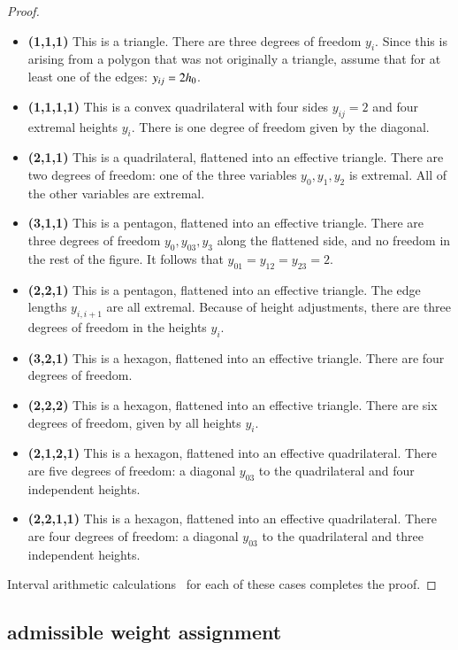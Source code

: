 \begin{proof}
\begin{itemize}
\item {\bf (1,1,1)}  This is a triangle.  There are three degrees of
freedom $y_i$.  Since this is arising from a polygon that was not originally a triangle,  assume that for at least one of the edges: $y_{ij}=2{h_0}$.
\item {\bf (1,1,1,1)}  This is a convex quadrilateral with four sides $y_{ij}=2$ and four extremal heights $y_i$.  There is one degree of freedom given by the diagonal.
\item {\bf (2,1,1)} This is a quadrilateral, flattened into an effective triangle.  There are two degrees of freedom: one of the three variables $y_0,y_1,y_2$ is extremal.  All of the other variables are extremal.
\item {\bf (3,1,1)}  This is a pentagon, flattened into an effective triangle.  There are three degrees of freedom $y_0,y_{03},y_3$ along the flattened side, and no freedom in the rest of the figure.  It follows that $y_{01}=y_{12}=y_{23}=2$.
\item {\bf (2,2,1)} This is a pentagon, flattened into an effective triangle.  The edge lengths $y_{i,i+1}$ are all extremal.  Because of height adjustments, there are three degrees of freedom in the heights $y_i$.
\item {\bf (3,2,1)} This is a hexagon, flattened into an effective triangle.  There are four degrees of freedom.
\item {\bf (2,2,2)}  This is a hexagon, flattened into an effective triangle.  There are six degrees of freedom, given by all heights $y_i$.
\item {\bf (2,1,2,1)} This is a hexagon, flattened into an effective quadrilateral.  There are five degrees of freedom: a diagonal $y_{03}$ to the quadrilateral and four independent heights.
\item {\bf (2,2,1,1)}  This is a hexagon, flattened into an effective quadrilateral.  There are four degrees of freedom: a diagonal $y_{03}$ to the quadrilateral and three independent heights.
%
%
%
%
\end{itemize}


Interval arithmetic calculations~\cite[cc:tau]{hales:2009:nonlinear} %
for each of these cases completes the proof. 
\end{proof}


\subsection{admissible weight assignment}

